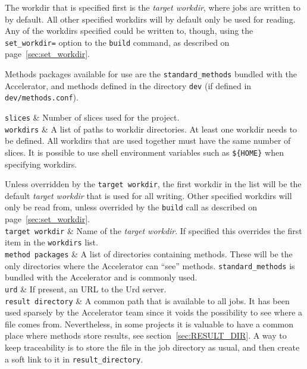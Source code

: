 The workdir that is specified first is the \textsl{target workdir},
where jobs are written to by default.  All other specified workdirs
will by default only be used for reading.  Any of the workdirs
specified could be written to, though, using the
\texttt{set\_workdir=} option to the \texttt{build} command, as
described on page~\ref{sec:set_workdir}.

Methods packages available for use are the \texttt{standard\_methods} bundled
with the Accelerator, and methods defined in the
directory \texttt{dev} (if defined in \texttt{dev/methods.conf}).

\starttabletwo

\RPtwo \texttt{slices} & Number of slices used for the project.\\[1ex]

\RPtwo \texttt{workdirs} & A list of paths to workdir directories.  At
least one workdir needs to be defined.  All workdirs that are used
together must have the same number of slices.  It is possible to use
shell environment variables such as \texttt{\$\{HOME\}} when
specifying workdirs.

Unless overridden by the \texttt{target workdir}, the first workdir in
the list will be the default \textsl{target workdir} that is used for
all writing.  Other specified workdirs will only be read from, unless
overrided by the \texttt{build} call as described on
page~\ref{sec:set_workdir}.\\[1ex]

\RPtwo \texttt{target workdir} & Name of the \textsl{target workdir}.
If specified this overrides the first item in the \texttt{workdirs}
list.\\[1ex]

\RPtwo \texttt{method packages} & A list of directories containing
methods.  These will be the only directories where the Accelerator can
``see'' methods.  \texttt{standard\_methods} is bundled with the
Accelerator and is commonly used.\\[1ex]

\RPtwo \texttt{urd} & If present, an URL to the Urd server.\\[1ex]

\RPtwo \texttt{result directory} & A common path that is available to
all jobs.  It has been used sparsely by the Accelerator team since it
voids the possibility to see where a file comes from.  Nevertheless,
in some projects it is valuable to have a common place where methods
store results, see section~\ref{sec:RESULT_DIR}.  A way to keep
traceability is to store the file in the job directory as usual, and
then create a soft link to it in \texttt{result\_directory}.\\[1ex]

